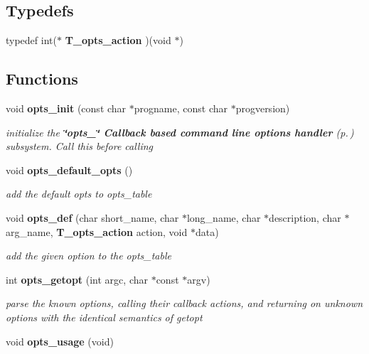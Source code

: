 \subsection*{Typedefs}
\begin{CompactItemize}
\item 
typedef int($\ast$ {\bf T\_\-opts\_\-action} )(void $\ast$)
\end{CompactItemize}
\subsection*{Functions}
\begin{CompactItemize}
\item 
void {\bf opts\_\-init} (const char $\ast$progname, const char $\ast$progversion)
\begin{CompactList}\small\item\em initialize the {\bf \char`\"{}opts\_\-\char`\"{} Callback based command line options handler} {\rm (p.\,\pageref{group__opts})} subsystem. Call this before calling\item\end{CompactList}\item 
{}
void {\bf opts\_\-default\_\-opts} ()\label{opts__utils_8h_a11}

\begin{CompactList}\small\item\em add the default opts to opts\_\-table\item\end{CompactList}\item 
void {\bf opts\_\-def} (char short\_\-name, char $\ast$long\_\-name, char $\ast$description, char $\ast$arg\_\-name, {\bf T\_\-opts\_\-action} action, void $\ast$data)
\begin{CompactList}\small\item\em add the given option to the opts\_\-table\item\end{CompactList}\item 
int {\bf opts\_\-getopt} (int argc, char $\ast$const $\ast$argv)
\begin{CompactList}\small\item\em parse the known options, calling their callback actions, and returning on unknown options with the identical semantics of getopt\item\end{CompactList}\item 
{}
void {\bf opts\_\-usage} (void)\label{opts__utils_8h_a14}


\end{CompactItemize}
